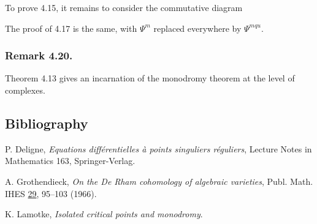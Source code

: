 To prove 4.15, it remains to consider the commutative diagram
\begin{center}
\end{center}
The proof of 4.17 is the same, with $\Psi^m$ replaced everywhere by
$\Psi^{mqu}$.

\subsubsection*{Remark 4.20.}
Theorem 4.13 gives an incarnation of the monodromy theorem at the
level of complexes.

\subsection*{Bibliography}

\begin{enumerate}[label={[\arabic*]},leftmargin=3em]
\item P. Deligne, \emph{Equations diff\'erentielles \`a points
  singuliers r\'eguliers}, Lecture Notes in Mathematics 163,
  Springer-Verlag.
\item A. Grothendieck, \emph{On the De Rham cohomology of algebraic
  varieties}, Publ. Math. IHES \underline{29}, 95--103 (1966).
\item K. Lamotke, \emph{Isolated critical points and monodromy}.
\end{enumerate}

